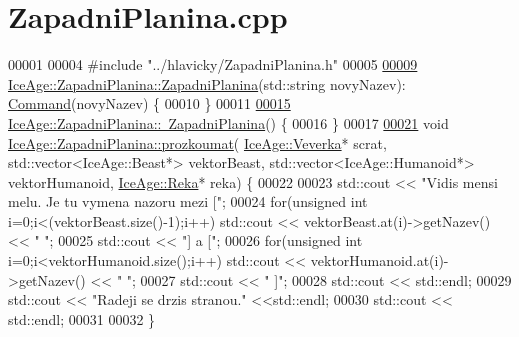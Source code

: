 \hypertarget{ZapadniPlanina_8cpp_source}{}\section{Zapadni\+Planina.\+cpp}
\label{ZapadniPlanina_8cpp_source}

\begin{DoxyCode}
00001 
00004 \textcolor{preprocessor}{#include "../hlavicky/ZapadniPlanina.h"}
00005 
\hypertarget{ZapadniPlanina_8cpp_source.tex_l00009}{}\hyperlink{classIceAge_1_1ZapadniPlanina_a00bed05e6c94978be3a6ab06097fb7f5}{00009} \hyperlink{classIceAge_1_1ZapadniPlanina_a00bed05e6c94978be3a6ab06097fb7f5}{IceAge::ZapadniPlanina::ZapadniPlanina}(std::string novyNazev):
      \hyperlink{classIceAge_1_1Command}{Command}(novyNazev) \{
00010 \}
00011 
\hypertarget{ZapadniPlanina_8cpp_source.tex_l00015}{}\hyperlink{classIceAge_1_1ZapadniPlanina_a232195b066da4fa8eaa4e6524de6954d}{00015} \hyperlink{classIceAge_1_1ZapadniPlanina_a232195b066da4fa8eaa4e6524de6954d}{IceAge::ZapadniPlanina::~ZapadniPlanina}() \{
00016 \}
00017 
\hypertarget{ZapadniPlanina_8cpp_source.tex_l00021}{}\hyperlink{classIceAge_1_1ZapadniPlanina_a328d18a38647899a301125ac42ac9fd3}{00021} \textcolor{keywordtype}{void} \hyperlink{classIceAge_1_1ZapadniPlanina_a328d18a38647899a301125ac42ac9fd3}{IceAge::ZapadniPlanina::prozkoumat}(
      \hyperlink{classIceAge_1_1Veverka}{IceAge::Veverka}* scrat, std::vector<IceAge::Beast*> vektorBeast, 
      std::vector<IceAge::Humanoid*> vektorHumanoid, \hyperlink{classIceAge_1_1Reka}{IceAge::Reka}* reka) \{
00022 
00023     std::cout << \textcolor{stringliteral}{"Vidis mensi melu. Je tu vymena nazoru mezi ["};
00024     \textcolor{keywordflow}{for}(\textcolor{keywordtype}{unsigned} \textcolor{keywordtype}{int} i=0;i<(vektorBeast.size()-1);i++) std::cout << vektorBeast.at(i)->getNazev() << \textcolor{stringliteral}{" "};
00025     std::cout << \textcolor{stringliteral}{"] a ["};
00026     \textcolor{keywordflow}{for}(\textcolor{keywordtype}{unsigned} \textcolor{keywordtype}{int} i=0;i<vektorHumanoid.size();i++) std::cout << vektorHumanoid.at(i)->getNazev() << \textcolor{stringliteral}{" "};
00027     std::cout << \textcolor{stringliteral}{" ]"};
00028     std::cout << std::endl;
00029     std::cout << \textcolor{stringliteral}{"Radeji se drzis stranou."} <<std::endl;
00030     std::cout << std::endl;
00031 
00032 \}
\end{DoxyCode}
